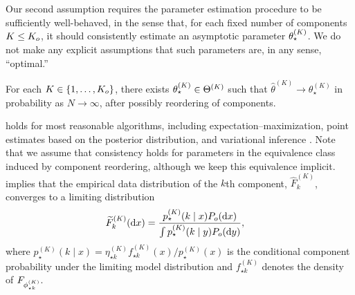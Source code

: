 Our second assumption requires the parameter estimation procedure to be sufficiently well-behaved,
in the sense that, for each fixed number of components $K \le K_{o}$, it should consistently estimate an asymptotic parameter $\theta_{\star}^{(K)}$.
We do not make any explicit assumptions that such parameters are, in any sense, ``optimal.''

\begin{assumption}\label{assump:inference-regularity}
	For each $K \in \{1,\dots, K_{o}\}$, there exists $\theta_{\star}^{(K)} \in \Theta^{(K)}$ such that
	$\widehat\theta^{(K)} \to \theta_{\star}^{(K)}$ in probability as $N \rightarrow \infty$,
	after possibly reordering of components.
\end{assumption}

\begin{remark}
 holds for most reasonable algorithms, including expectation--maximization, point estimates based on the posterior distribution,
and variational inference \citep{Balakrishnan:2017,Walker:2001,Wang:2019}.
Note that we assume that consistency holds for parameters in the equivalence class induced by component reordering, although we keep
this equivalence implicit.
 implies that the empirical data distribution of the $k$th component,
$\widehat{F}^{(K)}_k$, %
converges to a limiting distribution
\begin{align}
	\widetilde{F}^{(K)}_{k}(\dee x) & = \frac{p_{\star}^{(K)}(k\mid x)P_o(\dee x) }{\int p_{\star}^{(K)}(k\mid y)P_o(\dee y)}, \label{eq:phat-def}
\end{align}
where $p_{\star}^{(K)}(k \mid x) = \eta^{(K)}_{\star k}f_{\star k}^{(K)}(x)/p^{(K)}_{\star}(x)$ is the
conditional component probability under the limiting model distribution
 and $f_{\star k}^{(K)}$ denotes the density of $F_{\phi^{(K)}_{\star k}}$.
\end{remark}

